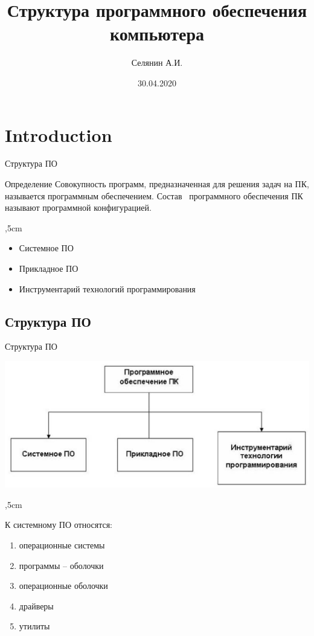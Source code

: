 \documentclass{beamer}
\title[Структура ПО]{Структура программного обеспечения компьютера}
\author{Селянин А.И.}
\institute{585 группа}
\date{30.04.2020}
\begin{document}
\begin{frame}
  \titlepage
\end{frame}

\section{Introduction}

\begin{frame}{Структура ПО}

\begin{block}{Определение}
Совокупность программ, предназначенная для решения задач на ПК, называется программным обеспечением. Состав  программного обеспечения ПК называют программной конфигурацией.
\end{block}

,5cm

\begin{itemize}
  \item Системное ПО
  \item Прикладное ПО
  \item Инструментарий технологий программирования
\end{itemize}

\end{frame}

\subsection{Структура ПО}

\begin{frame}{Структура ПО}

\includegraphics[width=1\linewidth]{22.jpg}

\end{frame}

\begin{frame}

,5cm

К системному ПО относятся:
\begin{enumerate} 
  \item операционные системы 
  \item программы – оболочки
  \item операционные оболочки
  \item драйверы
  \item утилиты
\end{enumerate}

\end{frame}
\end{document}
